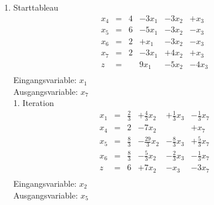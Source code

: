 \documentclass[a4paper]{scrartcl}
\begin{document}
\begin{enumerate}
\begin{enumerate}
                    \item
                        Starttableau
                        \begin{equation}
                            \begin{array}{rcrrrr}
                                x_4 & = & 4 & -3x_1 & -3x_2 & +x_3 \\
                                x_5 & = & 6 & -5x_1 & -3x_2 & -x_3 \\
                                x_6 & = & 2 &  +x_1 & -3x_2 & -x_3 \\
                                x_7 & = & 2 & -3x_1 & +4x_2 & +x_3 \\
                                \hline
                                z   & = &   & 9x_1 & -5x_2 & -4x_3 \\
                            \end{array}
                        \end{equation}
                        Eingangsvariable: $x_1$ \\
                        Ausgangsvariable: $x_7$ \\

                        1. Iteration
                        \begin{equation}
                            \begin{array}{rcrrrr}
                                x_1 & = & \frac{2}{3} & +\frac{4}{3}x_2 & +\frac{1}{3}x_3 & -\frac{1}{3}x_7 \\
                                x_4 & = & 2 & -7x_2 &  & +x_7 \\
                                x_5 & = & \frac{8}{3} & -\frac{29}{3}x_2 & -\frac{8}{3}x_3 & +\frac{5}{3}x_7 \\
                                x_6 & = & \frac{8}{3} & -\frac{5}{3}x_2 & -\frac{2}{3}x_3 & -\frac{1}{3}x_7 \\
                                \hline
                                z   & = & 6 & +7x_2 & -x_3 & -3x_7 \\
                            \end{array}
                        \end{equation}
                        Eingangsvariable: $x_2$ \\
                        Ausgangsvariable: $x_5$ \\


\end{enumerate}
\end{enumerate}
\end{document}

